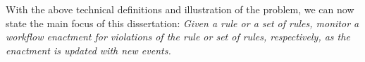 With the above technical definitions
and illustration of the problem,
we can now state the main focus of this dissertation:
{\em Given a rule or a set of rules,
monitor a workflow enactment
for violations of the rule or set of rules, respectively,
as the enactment is updated with new events.}
